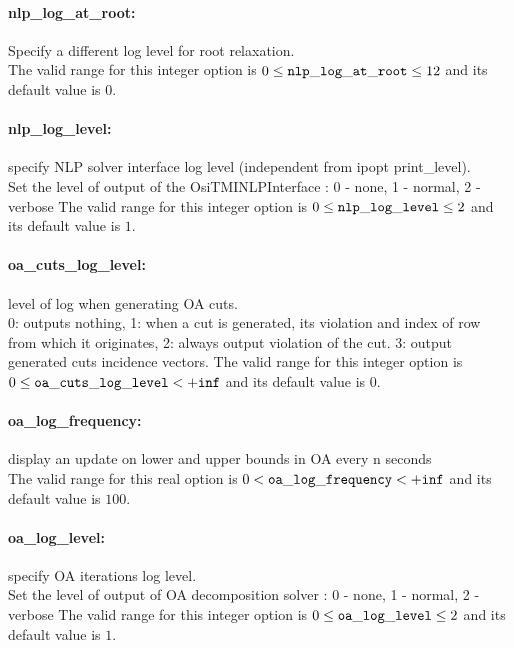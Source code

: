 \paragraph{nlp\_log\_at\_root:}\label{opt:nlp_log_at_root}  Specify a different log level for root relaxation. \\
 The valid range for this integer option is
$0 \le {\tt nlp\_log\_at\_root } \le 12$
and its default value is $0$.


\paragraph{nlp\_log\_level:}\label{opt:nlp_log_level} specify NLP solver interface log level (independent from ipopt print\_level). \\
 Set the level of output of the OsiTMINLPInterface : 0 - none, 1 - normal, 2 - verbose The valid range for this integer option is
$0 \le {\tt nlp\_log\_level } \le 2$
and its default value is $1$.


\paragraph{oa\_cuts\_log\_level:}\label{opt:oa_cuts_log_level} level of log when generating OA cuts. \\
 0: outputs nothing,
1: when a cut is generated, its violation and index of row from which it originates,
2: always output violation of the cut.
3: output generated cuts incidence vectors. The valid range for this integer option is
$0 \le {\tt oa\_cuts\_log\_level } <  {\tt +inf}$
and its default value is $0$.


\paragraph{oa\_log\_frequency:}\label{opt:oa_log_frequency} display an update on lower and upper bounds in OA every n seconds \\
 The valid range for this real option is 
$0 <  {\tt oa\_log\_frequency } <  {\tt +inf}$
and its default value is $100$.


\paragraph{oa\_log\_level:}\label{opt:oa_log_level} specify OA iterations log level. \\
 Set the level of output of OA decomposition solver : 0 - none, 1 - normal, 2 - verbose The valid range for this integer option is
$0 \le {\tt oa\_log\_level } \le 2$
and its default value is $1$.


